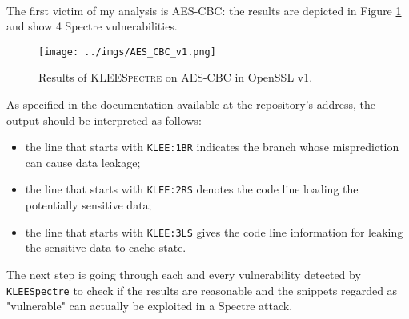 \documentclass[12pt,a4paper]{book}
\theoremstyle{definition}
\begin{document}
	\paragraph{}The first victim of my analysis is AES-CBC: the results are depicted in Figure \ref{fig:result_cbc_v1} and show 4 Spectre vulnerabilities. 
	\begin{figure}[!h]
		\centering
		\texttt{[image: ../imgs/AES\_CBC\_v1.png]}
		\captionsetup{width=.9\linewidth}
		\caption{Results of \textsc{KLEESpectre} on AES-CBC in OpenSSL v1.}
		\label{fig:result_cbc_v1}
	\end{figure}
	As specified in the documentation available at the repository's address, the output should be interpreted as follows:
	\begin{itemize}
		\item the line that starts with \texttt{KLEE:1BR} indicates the branch whose misprediction can cause data leakage;
		\item the line that starts with \texttt{KLEE:2RS} denotes the code line loading the potentially sensitive data;
		\item the line that starts with \texttt{KLEE:3LS} gives the code line information for leaking the sensitive data to cache state.
	\end{itemize}
	The next step is going through each and every vulnerability detected by \texttt{KLEESpectre} to check if the results are reasonable and the snippets regarded as "vulnerable" can actually be exploited in a Spectre attack. 
	
\end{document}
